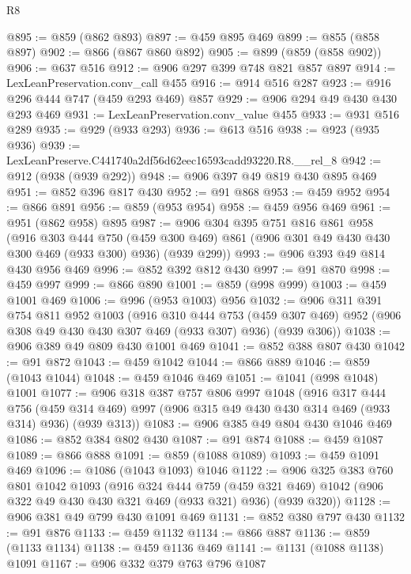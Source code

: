 \begin{lexlean}{R8}
\begin{coremodule}
@895 := @859 (@862 @893)
@897 := @459 @895 @469
@899 := @855 (@858 @897)
@902 := @866 (@867 @860 @892)
@905 := @899 (@859 (@858 @902))
@906 := @637 @516
@912 := @906 @297 @399 @748 @821 @857 @897
@914 := LexLeanPreservation.conv_call @455
@916 := @914 @516 @287
@923 := @916 @296 @444 @747 (@459 @293 @469) @857
@929 := @906 @294 @49 @430 @430 @293 @469
@931 := LexLeanPreservation.conv_value @455
@933 := @931 @516 @289
@935 := @929 (@933 @293)
@936 := @613 @516
@938 := @923 (@935 @936)
@939 := LexLeanPreserve.C441740a2df56d62eec16593cadd93220.R8.__rel_8
@942 := @912 (@938 (@939 @292))
@948 := @906 @397 @49 @819 @430 @895 @469
@951 := @852 @396 @817 @430
@952 := @91 @868
@953 := @459 @952
@954 := @866 @891
@956 := @859 (@953 @954)
@958 := @459 @956 @469
@961 := @951 (@862 @958) @895
@987 := @906
    @304
    @395
    @751
    @816
    @861
    @958
    (@916
      @303
      @444
      @750
      (@459 @300 @469)
      @861
      (@906 @301 @49 @430 @430 @300 @469 (@933 @300) @936)
      (@939 @299))
@993 := @906 @393 @49 @814 @430 @956 @469
@996 := @852 @392 @812 @430
@997 := @91 @870
@998 := @459 @997
@999 := @866 @890
@1001 := @859 (@998 @999)
@1003 := @459 @1001 @469
@1006 := @996 (@953 @1003) @956
@1032 := @906
    @311
    @391
    @754
    @811
    @952
    @1003
    (@916
      @310
      @444
      @753
      (@459 @307 @469)
      @952
      (@906 @308 @49 @430 @430 @307 @469 (@933 @307) @936)
      (@939 @306))
@1038 := @906 @389 @49 @809 @430 @1001 @469
@1041 := @852 @388 @807 @430
@1042 := @91 @872
@1043 := @459 @1042
@1044 := @866 @889
@1046 := @859 (@1043 @1044)
@1048 := @459 @1046 @469
@1051 := @1041 (@998 @1048) @1001
@1077 := @906
    @318
    @387
    @757
    @806
    @997
    @1048
    (@916
      @317
      @444
      @756
      (@459 @314 @469)
      @997
      (@906 @315 @49 @430 @430 @314 @469 (@933 @314) @936)
      (@939 @313))
@1083 := @906 @385 @49 @804 @430 @1046 @469
@1086 := @852 @384 @802 @430
@1087 := @91 @874
@1088 := @459 @1087
@1089 := @866 @888
@1091 := @859 (@1088 @1089)
@1093 := @459 @1091 @469
@1096 := @1086 (@1043 @1093) @1046
@1122 := @906
    @325
    @383
    @760
    @801
    @1042
    @1093
    (@916
      @324
      @444
      @759
      (@459 @321 @469)
      @1042
      (@906 @322 @49 @430 @430 @321 @469 (@933 @321) @936)
      (@939 @320))
@1128 := @906 @381 @49 @799 @430 @1091 @469
@1131 := @852 @380 @797 @430
@1132 := @91 @876
@1133 := @459 @1132
@1134 := @866 @887
@1136 := @859 (@1133 @1134)
@1138 := @459 @1136 @469
@1141 := @1131 (@1088 @1138) @1091
@1167 := @906
    @332
    @379
    @763
    @796
    @1087

\end{coremodule}
\end{lexlean}
